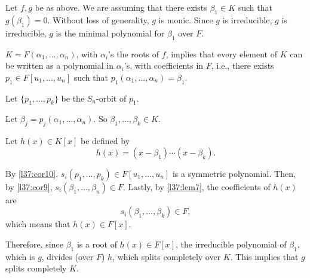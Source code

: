 \begin{dem}
	Let $f, g$ be as above. We are assuming that there exists $\beta_1 \in K$ such that $g(\beta_1) = 0$. Without loss of generality, $g$ is monic. Since $g$ is irreducible, $g$ is irreducible, $g$ is the minimal polynomial for $\beta_1$ over $F$.

	$K = F(\alpha_1, \dots, \alpha_n)$, with $\alpha_i$'s the roots of $f$, implies that every element of $K$ can be written as a polynomial in $\alpha_i$'s, with coefficients in $F$, i.e., there exists $p_1 \in F[u_1, \dots, u_n]$ such that $p_1(\alpha_1, \dots, \alpha_n) = \beta_1$.

	Let $\{p_1, \dots, p_k\}$ be the $S_n$-orbit of $p_1$.

	Let $\beta_j = p_j(\alpha_1, \dots, \alpha_n)$. So $\beta_1, \dots, \beta_k \in K$.

	Let $h(x) \in K[x]$ be defined by \[
		h(x) = (x - \beta_1) \cdots (x - \beta_k). 
	\]

	By \cref{l37:cor10}, $s_i(p_1, \dots, p_k) \in F[u_1, \dots, u_n]$ is a symmetric polynomial.
	Then, by \cref{l37:cor9}, $s_i(\beta_1, \dots, \beta_n) \in F$.
	Lastly, by \cref{l37:lem7}, the coefficients of $h(x)$ are \[
		s_i(\beta_1, \dots, \beta_k) \in F,
	\]
	which means that $h(x) \in F[x]$.

	Therefore, since $\beta_1$ is a root of $h(x) \in F[x]$, the irreducible polynomial of $\beta_1$, which is  $g$, divides (over $F$) $h$, which splits completely over $K$. This implies that $g$ splits completely $K$.
\end{dem}
